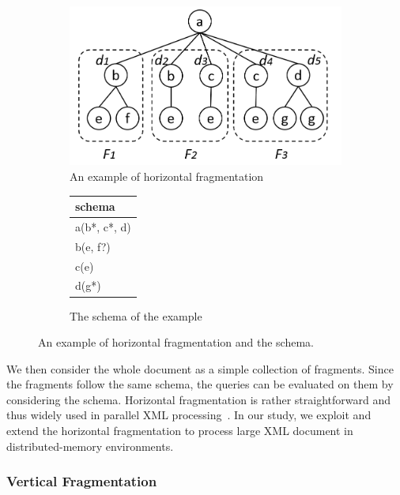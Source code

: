 \begin{figure}[t]
	\centering
	\begin{subfigure}{.6\textwidth}
		\centering
		\includegraphics[width=.99\linewidth]{figures/hfrag_example}
		\caption{An example of horizontal fragmentation}
		\label{fig:sub1}
	\end{subfigure}%
	\begin{subfigure}{.4\textwidth}
		\centering
		\vspace{12mm}
		\begin{tabular}{|l|}
			\hline
			schema\\
			\hline
			a(b*, c*, d) \\
			b(e, f?) \\
			c(e) \\
			d(g*) \\
			\hline
		\end{tabular}
		\vspace{12mm}
		\caption{The schema of the example}
		\label{fig:sub2}
	\end{subfigure}
	\caption{An example of horizontal fragmentation and the schema.}
	\label{fig:hfrag_example}
\end{figure}

We then consider the whole document as a simple collection of fragments. Since
the fragments follow the same schema, the queries can be evaluated on them by
considering the schema. Horizontal fragmentation is rather straightforward and
thus widely used in parallel XML processing~\cite{DaGP14,BoLS09,AfDG15,CCMN15}.
In our study, we exploit and extend the horizontal fragmentation to process
large  XML document in distributed-memory environments.

\subsubsection{Vertical Fragmentation} 
\label{sec:vfragment}

